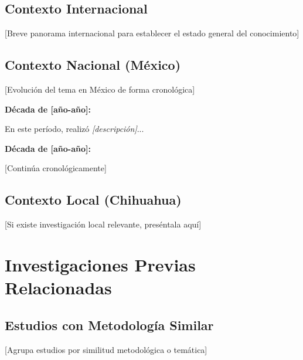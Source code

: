 \subsection{Contexto Internacional}
\label{subsec:contexto_internacional}

[Breve panorama internacional para establecer el estado general del conocimiento]

\subsection{Contexto Nacional (México)}
\label{subsec:contexto_nacional}

[Evolución del tema en México de forma cronológica]

\textbf{Década de [año-año]:}

En este período, \cite{autor_mexico} realizó \textit{[descripción]}...

\textbf{Década de [año-año]:}

[Continúa cronológicamente]

\subsection{Contexto Local (Chihuahua)}
\label{subsec:contexto_local}

[Si existe investigación local relevante, preséntala aquí]

\section{Investigaciones Previas Relacionadas}
\label{sec:investigaciones_previas}


\subsection{Estudios con Metodología Similar}
\label{subsec:metodologia_similar}

[Agrupa estudios por similitud metodológica o temática]

